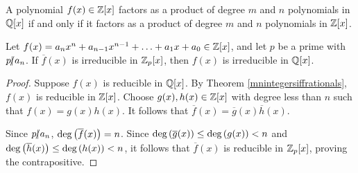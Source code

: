 \documentclass[11pt,fleqn,dvipsnames,usenames]{article}
\newcommand{\p}{\noindent}
\begin{document}
\begin{theorem}\label{mnintegersiffrationals}
A polynomial $f(x)\in \mathbb{Z}[x]$ factors as a product of degree $m$ and $n$ polynomials in $\mathbb{Q}[x]$ if and only if it factors as a product of degree $m$ and $n$ polynomials in $\mathbb{Z}[x]$.
\end{theorem}
%
%
\begin{theorem}\label{gausslemma}
Let $f(x) = a_{n}x^{n} + a_{n-1}x^{n-1} + \ldots + a_{1}x + a_{0}\in\mathbb{Z}[x]$, and let $p$ be a prime with $p|\kern-0.9ex{/} a_{n}$.  If $\overline{f}(x)$ is irreducible in $\mathbb{Z}_p[x]$, then $f(x)$ is irreducible in $\mathbb{Q}[x]$.
\end{theorem}
%
\begin{proof}
Suppose $f(x)$ is reducible in $\mathbb{Q}[x]$.  By Theorem \ref{mnintegersiffrationals}, $f(x)$ is reducible in $\mathbb{Z}[x]$.  Choose $g(x),h(x)\in\nolinebreak\ZX$ with degree less than $n$ such that $f(x) = g(x)h(x)$.  It follows that $\overline{f}(x) = \overline{g}(x)\overline{h}(x)$.
\vsp

\p Since $p|\kern-0.9ex{/} a_{n}$, $\text{deg}\left(\overline{f}(x)\right) = n$.  Since $\text{deg}\left(\overline{g}(x)\right)\leq \text{deg}\left(g(x)\right) < n$ and $\text{deg}\left(\overline{h}(x)\right)\leq \text{deg}\left(h(x)\right) < n$, it follows that $\overline{f}(x)$ is reducible in $\mathbb{Z}_{p}[x]$, proving the contrapositive.
\end{proof}
%
\end{document}
